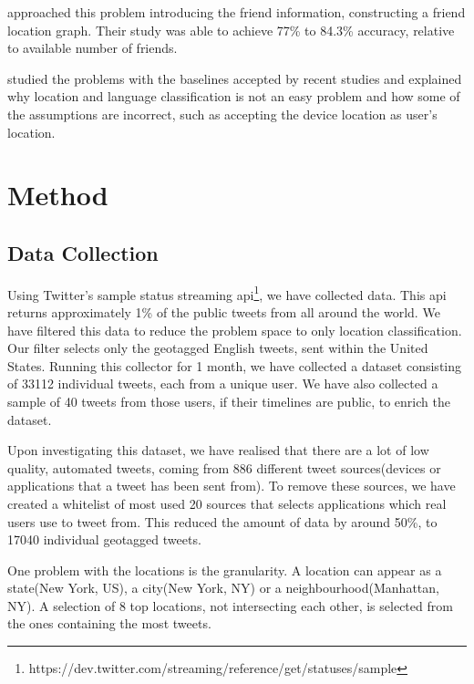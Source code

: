 \documentclass[twoside,11pt]{article}
\begin{document}
\cite{sadilek2012finding} approached this problem introducing the friend information, constructing a friend location graph. Their study was able to achieve 77\% to 84.3\% accuracy, relative to available number of friends.

\cite{graham2014world} studied the problems with the baselines accepted by recent studies and explained why location and language classification is not an easy problem and how some of the assumptions are incorrect, such as accepting the device location as user's location. 

\section{Method}
\subsection{Data Collection}
Using Twitter's sample status streaming api\footnote{https://dev.twitter.com/streaming/reference/get/statuses/sample}, we have collected data. This api returns approximately 1\% of the public tweets from all around the world. We have filtered this data to reduce the problem space to only location classification. Our filter selects only the geotagged English tweets, sent within the United States. Running this collector for 1 month, we have collected a dataset consisting of 33112 individual tweets, each from a unique user. We have also collected a sample of 40 tweets from those users, if their timelines are public, to enrich the dataset. 

Upon investigating this dataset, we have realised that there are a lot of low quality, automated tweets, coming from 886 different tweet sources(devices or applications that a tweet has been sent from). To remove these sources, we have created a whitelist of most used 20 sources that selects applications which real users use to tweet from. This reduced the amount of data by around 50\%, to 17040 individual geotagged tweets. 

One problem with the locations is the granularity. A location can appear as a state(New York, US), a city(New York, NY) or a neighbourhood(Manhattan, NY). A selection of 8 top locations, not intersecting each other, is selected from the ones containing the most tweets.
\end{document}
